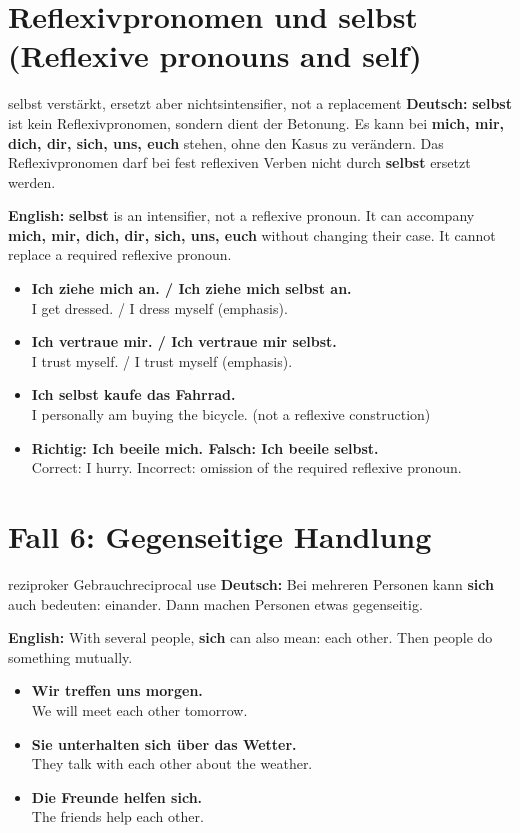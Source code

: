 \documentclass[a4paper,11pt]{article}
\newcommand{\GermanText}[1]{\textbf{Deutsch: }#1\par}
\newcommand{\EnglishText}[1]{{\small\color{SoftGray}\textbf{English: }#1\par}}
\newcommand{\ExampleItem}[2]{\item \textbf{#1}\\{\small\color{SoftGray}#2}}
\begin{document}
    

    \section{Reflexivpronomen und \glqq selbst\grqq{} (Reflexive pronouns and self)}
        \begin{grammarentry}{\glqq selbst\grqq{} verstärkt, ersetzt aber nichts}{intensifier, not a replacement}
            \GermanText{\textbf{selbst} ist kein Reflexivpronomen, sondern dient der Betonung. Es kann bei \textbf{mich, mir, dich, dir, sich, uns, euch} stehen, ohne den Kasus zu verändern. Das Reflexivpronomen darf bei fest reflexiven Verben nicht durch \textbf{selbst} ersetzt werden.}
            \EnglishText{\textbf{selbst} is an intensifier, not a reflexive pronoun. It can accompany \textbf{mich, mir, dich, dir, sich, uns, euch} without changing their case. It cannot replace a required reflexive pronoun.}
            \begin{exbox}
                \begin{itemize}
                    \ExampleItem{Ich ziehe mich an. / Ich ziehe mich selbst an.}{I get dressed. / I dress myself (emphasis).}
                    \ExampleItem{Ich vertraue mir. / Ich vertraue mir selbst.}{I trust myself. / I trust myself (emphasis).}
                    \ExampleItem{Ich selbst kaufe das Fahrrad.}{I personally am buying the bicycle. (not a reflexive construction)}
                    \ExampleItem{Richtig: Ich beeile mich. Falsch: Ich beeile selbst.}{Correct: I hurry. Incorrect: omission of the required reflexive pronoun.}
                \end{itemize}
            \end{exbox}
        \end{grammarentry}

    \section{Fall 6: Gegenseitige Handlung}
        
        \begin{grammarentry}{reziproker Gebrauch}{reciprocal use}
            \GermanText{Bei mehreren Personen kann \textbf{sich} auch bedeuten: einander. Dann machen Personen etwas gegenseitig.}
            \EnglishText{With several people, \textbf{sich} can also mean: each other. Then people do something mutually.}
            
            \begin{exbox}
                \begin{itemize}
                    \ExampleItem{Wir treffen uns morgen.}{We will meet each other tomorrow.}
                    \ExampleItem{Sie unterhalten sich über das Wetter.}{They talk with each other about the weather.}
                    \ExampleItem{Die Freunde helfen sich.}{The friends help each other.}
                \end{itemize}
            \end{exbox}
        \end{grammarentry}
    
\end{document}
